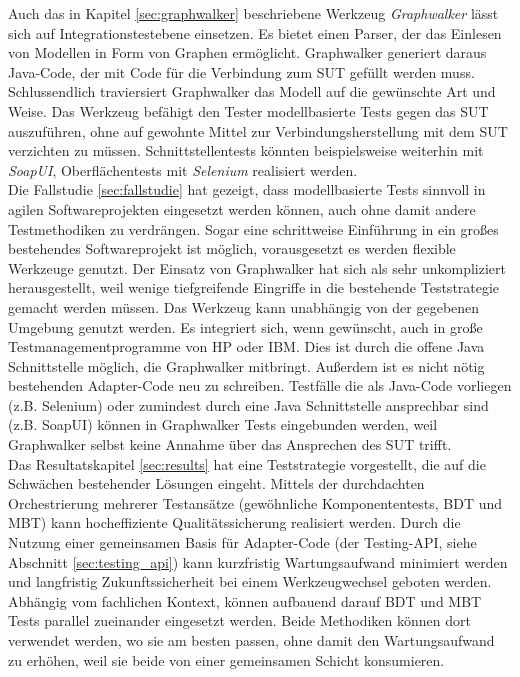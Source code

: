 Auch das in Kapitel \ref{sec:graphwalker} beschriebene Werkzeug \textit{Graphwalker} lässt sich auf Integrationstestebene einsetzen. Es bietet einen Parser, der das Einlesen von Modellen in Form von Graphen ermöglicht. Graphwalker generiert daraus Java-Code, der mit Code für die Verbindung zum \Gls{SUT} gefüllt werden muss. Schlussendlich traviersiert Graphwalker das Modell auf die gewünschte Art und Weise. Das Werkzeug befähigt den Tester modellbasierte Tests gegen das \Gls{SUT} auszuführen, ohne auf gewohnte Mittel zur Verbindungsherstellung mit dem \Gls{SUT} verzichten zu müssen. Schnittstellentests könnten beispielsweise weiterhin mit \textit{SoapUI}, Oberflächentests mit \textit{Selenium} realisiert werden.\\
Die Fallstudie \ref{sec:fallstudie}  hat gezeigt, dass modellbasierte Tests sinnvoll in agilen Softwareprojekten eingesetzt werden können, auch ohne damit andere Testmethodiken zu verdrängen. Sogar eine schrittweise Einführung in ein großes bestehendes Softwareprojekt ist möglich, vorausgesetzt es werden flexible Werkzeuge genutzt. Der Einsatz von Graphwalker hat sich als sehr unkompliziert herausgestellt, weil wenige tiefgreifende Eingriffe in die bestehende Teststrategie gemacht werden müssen. Das Werkzeug kann unabhängig von der gegebenen Umgebung genutzt werden. Es integriert sich, wenn gewünscht, auch in große Testmanagementprogramme von HP oder IBM. Dies ist durch die offene Java Schnittstelle möglich, die Graphwalker mitbringt. Außerdem ist es nicht nötig bestehenden Adapter-Code neu zu schreiben. Testfälle die als Java-Code vorliegen (z.B. Selenium) oder zumindest durch eine Java Schnittstelle ansprechbar sind (z.B. SoapUI) können in Graphwalker Tests eingebunden werden, weil Graphwalker selbst keine Annahme über das Ansprechen des \Gls{SUT} trifft.\\
Das Resultatskapitel \ref{sec:results} hat eine Teststrategie vorgestellt, die auf die Schwächen bestehender Lösungen eingeht. Mittels der durchdachten Orchestrierung mehrerer Testansätze (gewöhnliche Komponententests, \Gls{BDT} und \Gls{MBT}) kann hocheffiziente Qualitätssicherung realisiert werden. Durch die Nutzung einer gemeinsamen Basis für Adapter-Code (der Testing-API, siehe Abschnitt \ref{sec:testing_api}) kann kurzfristig Wartungsaufwand minimiert werden und langfristig Zukunftssicherheit bei einem Werkzeugwechsel geboten werden. 
Abhängig vom fachlichen Kontext, können aufbauend darauf \Gls{BDT} und \Gls{MBT} Tests parallel zueinander eingesetzt werden. Beide Methodiken können dort verwendet werden, wo sie am besten passen, ohne damit den Wartungsaufwand zu erhöhen, weil sie beide von einer gemeinsamen Schicht konsumieren.\\

